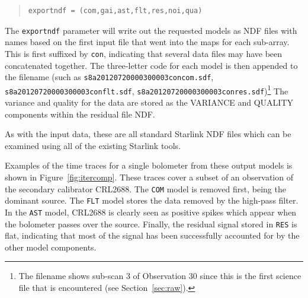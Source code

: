 \documentclass[twoside,11pt]{article}
\newcommand{\htmladdnormallink}[2]{#1}
\newcommand{\htmlref}[2]{#1}
\newenvironment{latexonly}{}{}
\newcommand{\latex}[1]{#1}
\newcommand{\latexhtml}[2]{#1}
\renewcommand{\_}{\texttt{\symbol{95}}}
\newenvironment{myquote}{\begin{quote}\begin{small}}{\end{small}\end{quote}}
\newcommand{\starlink}{\htmladdnormallink{Starlink}{http://starlink.jach.hawaii.edu}}
\newcommand{\cref}[3]{\latexhtml{#1~\ref{#2}}{\htmlref{#3}{#2}}}
\begin{document}
\vspace{0cm}
\begin{myquote}
\begin{verbatim}
exportndf = (com,gai,ast,flt,res,noi,qua)
\end{verbatim}
\end{myquote}
\vspace{0cm}
The \texttt{exportndf} parameter will write out the requested models
as NDF files with names based on the first input file that went into
the maps for each sub-array. This is first suffixed by \texttt{con},
indicating that several data files may have been concatenated
together. The three-letter code for each model is then appended to the
filename (such as \texttt{s8a20120720\_00030\_0003\_con\_com.sdf},
\begin{latexonly}
\linebreak          %
\end{latexonly}
\texttt{s8a20120720\_00030\_0003\_con\_flt.sdf},
\texttt{s8a20120720\_00030\_0003\_con\_res.sdf})\footnote{The filename shows
sub-scan 3 of Observation 30 since this is the first science file that
is encountered (see \cref{Section}{sec:raw}{Raw SCUBA-2 Data}).} The variance
and quality for the data are stored as the VARIANCE and QUALITY
components within the residual file NDF.

As with the input data, these are all standard {\starlink} NDF files
which can be examined using all of the existing Starlink tools.

Examples of the time traces for a single bolometer from these output
models is shown in \cref{Figure}{fig:itercomp}{time-domain components}.
These traces cover a
subset of an observation of the secondary calibrator CRL2688. The
\texttt{COM} model is removed first, being the dominant source. The
\texttt{FLT} model stores the data removed by the high-pass filter. In
the \texttt{AST} model, CRL2688 is clearly seen as positive spikes
which appear when the bolometer passes over the source. Finally, the
residual signal stored in \texttt{RES} is flat, indicating that most
of the signal has been successfully accounted for by the other model
components.
\end{document}
